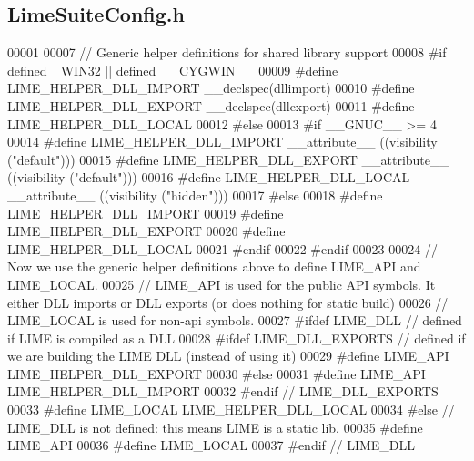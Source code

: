 \subsection{Lime\+Suite\+Config.\+h}
\label{LimeSuiteConfig_8h_source}

\begin{DoxyCode}
00001 
00007 \textcolor{comment}{// Generic helper definitions for shared library support}
00008 \textcolor{preprocessor}{#if defined \_WIN32 || defined \_\_CYGWIN\_\_}
00009 \textcolor{preprocessor}{  #define LIME\_HELPER\_DLL\_IMPORT \_\_declspec(dllimport)}
00010 \textcolor{preprocessor}{  #define LIME\_HELPER\_DLL\_EXPORT \_\_declspec(dllexport)}
00011 \textcolor{preprocessor}{  #define LIME\_HELPER\_DLL\_LOCAL}
00012 \textcolor{preprocessor}{#else}
00013 \textcolor{preprocessor}{  #if \_\_GNUC\_\_ >= 4}
00014 \textcolor{preprocessor}{    #define LIME\_HELPER\_DLL\_IMPORT \_\_attribute\_\_ ((visibility ("default")))}
00015 \textcolor{preprocessor}{    #define LIME\_HELPER\_DLL\_EXPORT \_\_attribute\_\_ ((visibility ("default")))}
00016 \textcolor{preprocessor}{    #define LIME\_HELPER\_DLL\_LOCAL  \_\_attribute\_\_ ((visibility ("hidden")))}
00017 \textcolor{preprocessor}{  #else}
00018 \textcolor{preprocessor}{    #define LIME\_HELPER\_DLL\_IMPORT}
00019 \textcolor{preprocessor}{    #define LIME\_HELPER\_DLL\_EXPORT}
00020 \textcolor{preprocessor}{    #define LIME\_HELPER\_DLL\_LOCAL}
00021 \textcolor{preprocessor}{  #endif}
00022 \textcolor{preprocessor}{#endif}
00023 
00024 \textcolor{comment}{// Now we use the generic helper definitions above to define LIME\_API and LIME\_LOCAL.}
00025 \textcolor{comment}{// LIME\_API is used for the public API symbols. It either DLL imports or DLL exports (or does nothing for
       static build)}
00026 \textcolor{comment}{// LIME\_LOCAL is used for non-api symbols.}
00027 \textcolor{preprocessor}{#ifdef LIME\_DLL // defined if LIME is compiled as a DLL}
00028 \textcolor{preprocessor}{  #ifdef LIME\_DLL\_EXPORTS // defined if we are building the LIME DLL (instead of using it)}
00029 \textcolor{preprocessor}{    #define LIME\_API LIME\_HELPER\_DLL\_EXPORT}
00030 \textcolor{preprocessor}{  #else}
00031 \textcolor{preprocessor}{    #define LIME\_API LIME\_HELPER\_DLL\_IMPORT}
00032 \textcolor{preprocessor}{  #endif // LIME\_DLL\_EXPORTS}
00033 \textcolor{preprocessor}{  #define LIME\_LOCAL LIME\_HELPER\_DLL\_LOCAL}
00034 \textcolor{preprocessor}{#else // LIME\_DLL is not defined: this means LIME is a static lib.}
00035 \textcolor{preprocessor}{  #define LIME\_API}
00036 \textcolor{preprocessor}{  #define LIME\_LOCAL}
00037 \textcolor{preprocessor}{#endif // LIME\_DLL}
\end{DoxyCode}
